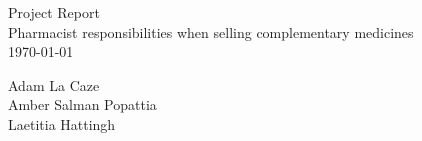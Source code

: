 % 
\begin{titlepage}
\raggedleft %
\vspace*{\baselineskip} %

{\Large Project Report}\\[0.167\textheight]


{\Huge Pharmacist responsibilities when selling complementary medicines} \\[\baselineskip] %


{\Large \today}

\vfill %

{\large Adam La Caze \\[3pt] Amber Salman Popattia \\[5pt] Laetitia Hattingh} 

\bigskip

\raggedright


\vspace*{3\baselineskip} %
\thispagestyle{empty}
\end{titlepage}
% 